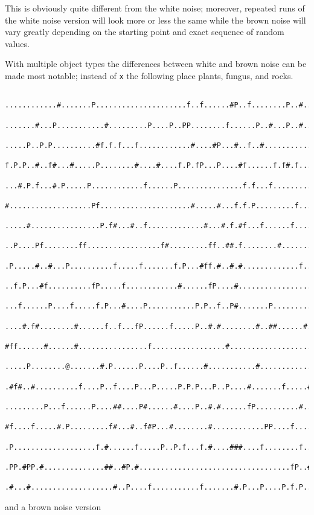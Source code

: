 \documentclass[12pt,a4paper]{article}
\begin{document}
This is obviously quite different from the white noise; moreover,
repeated runs of the white noise version will look more or less the same
while the brown noise will vary greatly depending on the starting point
and exact sequence of random values.

With multiple object types the differences between white and brown noise
can be made most notable; instead of \texttt{x} the following place
plants, fungus, and rocks.

\begin{verbatim}
  ............#.......P.....................f..f......#P..f........P..#..P
  .......#...P...........#.........P....P..PP........f......P..#...P..#..f
  .....P..P.P..........#f.f.f...f............#....#P...#..f..#............
  f.P.P..#..f#...#.....P........#....#....f.P.fP...P....#f......f.f#.f....
  ...#.P.f...#.P.....P............f......P...............f.f...f..........
  #...................Pf.....................#.....#...f.f.P.........f...P
  .....#................P.f#...#..f.............#...#.f.#f...f......f....P
  ..P....Pf........ff.................f#.........ff..##.f........#........
  .P.....#..#...P..........f.....f.......f.P...#ff.#..#.#.............f...
  ..f.P...#f..........fP.....f............#......fP....#..................
  ...f......P....f.....f.P...#....P...........P.P..f..P#.......P..........
  ....#.f#........#......f..f...fP......f.....P..#.#........#..##......#.P
  #ff......#......#................f.................#....................
  .....P........@.......#.P......P....P..f......#...........#.............
  .#f#..#..........f....P..f....P...P.....P.P.P...P..P....#.......f.....#.
  .........P...f......P....##....P#......#....P..#.#......fP..........#...
  #f....f.....#.P.........f#...#..f#P...#........#............PP....f....#
  .P...................f.#......f.....P..P.f...f.#....###....f........f..f
  .PP.#PP.#..............##..#P.#...................................fP..#.
  .#...#...................#..P....f...........f.......#.P...P....P.f.P..f
\end{verbatim}

and a brown noise version
\end{document}
